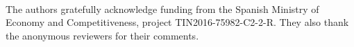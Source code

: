 \documentclass[11pt,twocolumn]{article}
\begin{document}
\ \\
 The authors gratefully acknowledge funding from the Spanish Ministry of Economy and Competitiveness, project TIN2016-75982-C2-2-R. They also thank the anonymous reviewers for their comments.





\end{document}
